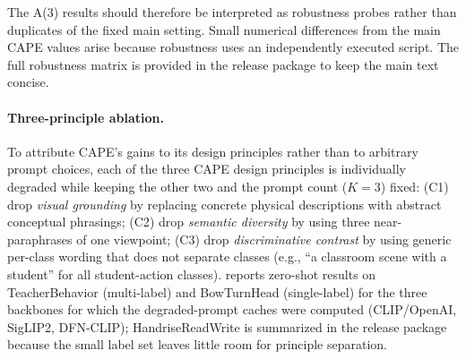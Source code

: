 \documentclass[symmetry,article,submit,pdftex,moreauthors]{Definitions/mdpi}
\begin{document}
The A(3) results should therefore be interpreted as robustness probes rather than duplicates of the fixed main setting. Small numerical differences from the main CAPE values arise because robustness uses an independently executed script. The full robustness matrix is provided in the release package to keep the main text concise.

\paragraph{Three-principle ablation.}
To attribute CAPE's gains to its design principles rather than to arbitrary prompt choices, each of the three CAPE design principles is individually degraded while keeping the other two and the prompt count ($K=3$) fixed: (\textsc{C1}) drop \emph{visual grounding} by replacing concrete physical descriptions with abstract conceptual phrasings; (\textsc{C2}) drop \emph{semantic diversity} by using three near-paraphrases of one viewpoint; (\textsc{C3}) drop \emph{discriminative contrast} by using generic per-class wording that does not separate classes (e.g., ``a classroom scene with a student'' for all student-action classes).  reports zero-shot results on TeacherBehavior (multi-label) and BowTurnHead (single-label) for the three backbones for which the degraded-prompt caches were computed (CLIP/OpenAI, SigLIP2, DFN-CLIP); HandriseReadWrite is summarized in the release package because the small label set leaves little room for principle separation.
\end{document}
